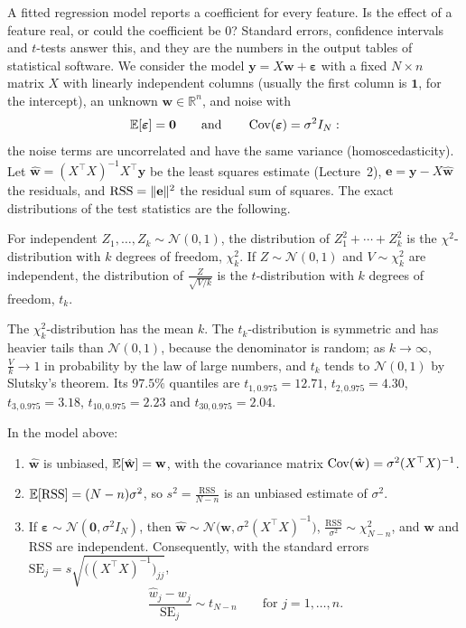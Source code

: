 A fitted regression model reports a coefficient for every feature. Is the effect of a feature real, or could the coefficient be $0$? Standard errors, confidence intervals and $t$-tests answer this, and they are the numbers in the output tables of statistical software. We consider the model $\mathbf{y} = X\mathbf{w} + \boldsymbol{\varepsilon}$ with a fixed $N \times n$ matrix $X$ with linearly independent columns (usually the first column is $\mathbf{1}$, for the intercept), an unknown $\mathbf{w} \in \mathbb{R}^n$, and noise with
\[\mathbb{E}[\boldsymbol{\varepsilon}] = \mathbf{0} \qquad \text{and} \qquad \operatorname{Cov}(\boldsymbol{\varepsilon}) = \sigma^2I_N:\]
the noise terms are uncorrelated and have the same variance (homoscedasticity). Let $\hat{\mathbf{w}} = (X^\top X)^{-1}X^\top\mathbf{y}$ be the least squares estimate (Lecture~2), $\mathbf{e} = \mathbf{y} - X\hat{\mathbf{w}}$ the residuals, and $\mathrm{RSS} = \lVert \mathbf{e} \rVert^2$ the residual sum of squares. The exact distributions of the test statistics are the following.

\begin{definition}\label{L4-def:chi2-t}
    For independent $Z_1, \ldots, Z_k \sim \mathcal{N}(0, 1)$, the distribution of $Z_1^2 + \cdots + Z_k^2$ is the $\chi^2$-distribution with $k$ degrees of freedom, $\chi^2_k$. If $Z \sim \mathcal{N}(0, 1)$ and $V \sim \chi^2_k$ are independent, the distribution of $\frac{Z}{\sqrt{V/k}}$ is the $t$-distribution with $k$ degrees of freedom, $t_k$.
\end{definition}

The $\chi^2_k$-distribution has the mean $k$. The $t_k$-distribution is symmetric and has heavier tails than $\mathcal{N}(0, 1)$, because the denominator is random; as $k \to \infty$, $\frac{V}{k} \to 1$ in probability by the law of large numbers, and $t_k$ tends to $\mathcal{N}(0, 1)$ by Slutsky's theorem. Its $97.5\%$ quantiles are $t_{1, 0.975} = 12.71$, $t_{2, 0.975} = 4.30$, $t_{3, 0.975} = 3.18$, $t_{10, 0.975} = 2.23$ and $t_{30, 0.975} = 2.04$.

\begin{theorem}\label{L4-thm:regression-inference}
    In the model above:
    \begin{enumerate}
        \item $\hat{\mathbf{w}}$ is unbiased, $\mathbb{E}[\hat{\mathbf{w}}] = \mathbf{w}$, with the covariance matrix $\operatorname{Cov}(\hat{\mathbf{w}}) = \sigma^2(X^\top X)^{-1}$.
        \item $\mathbb{E}[\mathrm{RSS}] = (N - n)\sigma^2$, so $s^2 = \frac{\mathrm{RSS}}{N - n}$ is an unbiased estimate of $\sigma^2$.
        \item If $\boldsymbol{\varepsilon} \sim \mathcal{N}(\mathbf{0}, \sigma^2I_N)$, then $\hat{\mathbf{w}} \sim \mathcal{N}\big(\mathbf{w}, \sigma^2(X^\top X)^{-1}\big)$, $\frac{\mathrm{RSS}}{\sigma^2} \sim \chi^2_{N-n}$, and $\hat{\mathbf{w}}$ and $\mathrm{RSS}$ are independent. Consequently, with the standard errors $\mathrm{SE}_j = s\sqrt{\big((X^\top X)^{-1}\big)_{jj}}$,
        \[\frac{\hat w_j - w_j}{\mathrm{SE}_j} \sim t_{N-n} \qquad \text{for } j = 1, \ldots, n.\]
    \end{enumerate}
\end{theorem}

